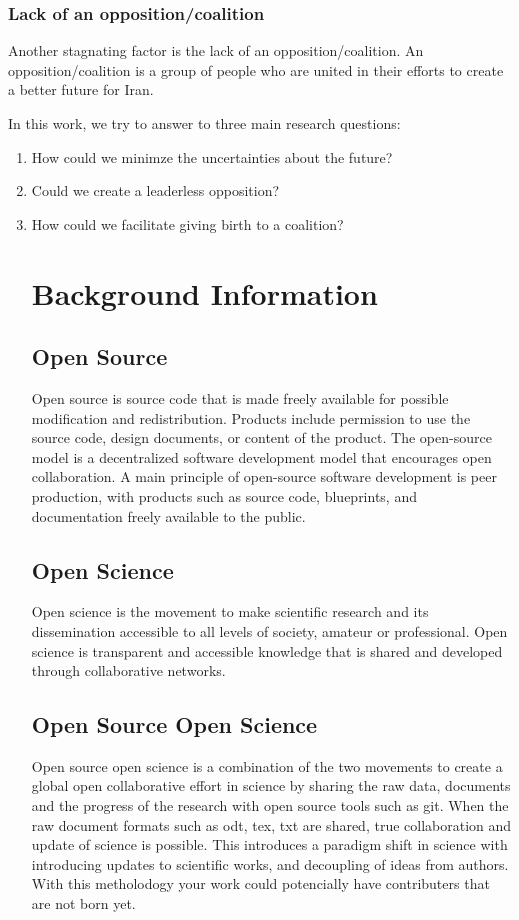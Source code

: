 \documentclass{IEEEtran}
\begin{document}
\subsubsection{Lack of an opposition/coalition}
Another stagnating factor is the lack of an opposition/coalition. An opposition/coalition is a group of people who are united in their efforts to create a better future for Iran.

In this work, we try to answer to three main research questions:

\begin{enumerate}
    \item How could we minimze the uncertainties about the future?
    \item Could we create a leaderless opposition?
    \item How could we facilitate giving birth to a coalition?




\section{Background Information}


\subsection{Open Source}
Open source is source code that is made freely available for possible modification and redistribution. Products include permission to use the source code, design documents, or content of the product. The open-source model is a decentralized software development model that encourages open collaboration. A main principle of open-source software development is peer production, with products such as source code, blueprints, and documentation freely available to the public.

\subsection{Open Science}
Open science is the movement to make scientific research and its dissemination accessible to all levels of society, amateur or professional. Open science is transparent and accessible knowledge that is shared and developed through collaborative networks.


\subsection{Open Source Open Science}
Open source open science is a combination of the two movements to create a global open collaborative effort in science by sharing the raw data, documents and the progress of the research with open source tools such as git.
When the raw document formats such as odt, tex, txt are shared, true collaboration and update of science is possible.
This introduces a paradigm shift in science with introducing updates to scientific works, and decoupling of ideas from authors. With this metholodogy your work could potencially have contributers that are not born yet.




\end{enumerate}
\end{document}
